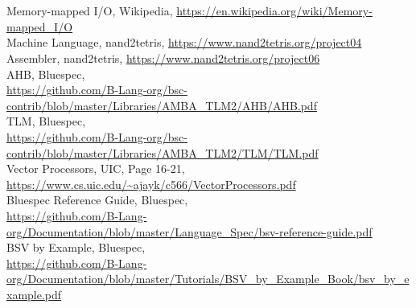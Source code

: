 \begin{refs}
    \\\\
    {\sdot} Memory-mapped I/O, Wikipedia,  {\color{RubineRed}\url{https://en.wikipedia.org/wiki/Memory-mapped_I/O}}\\
    {\sdot} Machine Language, nand2tetris, {\color{RubineRed}\url{https://www.nand2tetris.org/project04}}\\
    {\sdot} Assembler, nand2tetris, {\color{RubineRed}\url{https://www.nand2tetris.org/project06}}\\
    {\sdot} AHB, Bluespec,\\ {\color{RubineRed}\url{https://github.com/B-Lang-org/bsc-contrib/blob/master/Libraries/AMBA_TLM2/AHB/AHB.pdf}}\\
    {\sdot} TLM, Bluespec,\\
    {\color{RubineRed}\url{https://github.com/B-Lang-org/bsc-contrib/blob/master/Libraries/AMBA_TLM2/TLM/TLM.pdf}}\\
    {\sdot} Vector Processors, UIC, Page 16-21,\\ {\color{RubineRed}\url{https://www.cs.uic.edu/~ajayk/c566/VectorProcessors.pdf}}\\
    {\sdot} Bluespec Reference Guide, Bluespec,\\ {\color{RubineRed}\url{https://github.com/B-Lang-org/Documentation/blob/master/Language_Spec/bsv-reference-guide.pdf}}\\
    {\sdot} BSV by Example, Bluespec,\\ {\color{RubineRed}\url{https://github.com/B-Lang-org/Documentation/blob/master/Tutorials/BSV_by_Example_Book/bsv_by_example.pdf}}\\
\end{refs}
